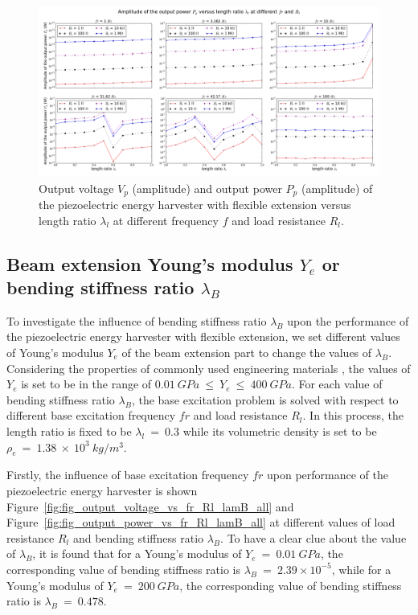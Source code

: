 \documentclass{elsarticle}
\begin{document}
\begin{figure}[!htbp]
    \centering
    \includegraphics[width=\textwidth]{./fig_pow_fr_sl_Rl_sl_vs_laml}
    \caption{Output voltage $V_p$ (amplitude) and output power $P_p$ (amplitude) of the piezoelectric energy harvester with flexible extension versus length ratio $\lambda_l$ at different frequency $f$ and load resistance $R_l$.  \color{red}{to be revised in the legend, add label (a), (b)} }
    \label{fig:fig_pow_fr_sl_Rl_sl_vs_laml}
\end{figure}


\subsection{Beam extension Young's modulus $Y_e$ or bending stiffness ratio $\lambda_B$}

To investigate the influence of bending stiffness ratio $\lambda_B$ upon the performance of the piezoelectric energy harvester with flexible extension, we set different values of Young's modulus $Y_e$ of the beam extension part to change the values of $\lambda_B$. Considering the properties of commonly used engineering materials \cite{warlimont2018springer}, the values of $Y_e$ is set to be in the range of $0.01\ GPa\ \leq\ Y_e\ \leq\ 400\ GPa$. For each value of bending stiffness ratio $\lambda_B$, the base excitation problem is solved with respect to different base excitation frequency $fr$ and load resistance $R_l$. In this process, the length ratio is fixed to be $\lambda_l\ =\ 0.3$ while its volumetric density is set to be $\rho_e\ =\ 1.38\ \times\ 10^3\ kg/m^3$.

Firstly, the influence of base excitation frequency $fr$ upon performance of the piezoelectric energy harvester is shown Figure~\ref{fig:fig_output_voltage_vs_fr_Rl_lamB_all} and Figure~\ref{fig:fig_output_power_vs_fr_Rl_lamB_all} at different values of load resistance $R_l$ and bending stiffness ratio $\lambda_B$. To have a clear clue about the value of $\lambda_B$, it is found that for a Young's modulus of $Y_e\ =\ 0.01\ GPa$, the corresponding value of bending stiffness ratio is $\lambda_B\ =\ 2.39\times10^{-5}$, while for a Young's modulus of $Y_e\ =\ 200\ GPa$, the corresponding value of bending stiffness ratio is $\lambda_B\ =\ 0.478$.
\end{document}
